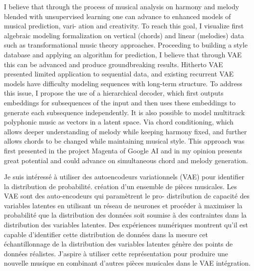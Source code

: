 I believe that through the process of musical analysis on harmony and melody blended
with unsupervised learning one can advance to enhanced models of musical prediction, vari-
ation and creativity. To reach this goal, I visualize first algebraic modeling formalization on
vertical (chords) and linear (melodies) data such as transformational music theory approaches.
Proceeding to building a style database and applying an algorithm for prediction, I believe that
through VAE this can be advanced and produce groundbreaking results.
Hitherto VAE presented limited application to sequential data, and existing recurrent VAE
models have difficulty modeling sequences with long-term structure. To address this issue, I
propose the use of a hierarchical decoder, which first outputs embeddings for subsequences
of the input and then uses these embeddings to generate each subsequence independently. It
is also possible to model multitrack polyphonic music as vectors in a latent space. Via chord
conditioning, which allows deeper understanding of melody while keeping harmony fixed,
and further allows chords to be changed while maintaining musical style. This approach was
first presented in the project Magenta of Google AI and in my opinion presents great potential
and could advance on simultaneous chord and melody generation.

Je suis intéressé à utiliser des autoencodeurs variationnels (VAE) pour identifier la distribution de probabilité.
création d’un ensemble de pièces musicales. Les VAE sont des auto-encodeurs qui paramètrent le pro-
distribution de capacité des variables latentes en utilisant un réseau de neurones et procéder à maximiser
la probabilité que la distribution des données soit soumise à des contraintes dans la distribution des variables latentes.
Des expériences numériques montrent qu'il est capable d'identifier cette distribution de données dans la mesure
cet échantillonnage de la distribution des variables latentes génère des points de données réalistes. J'aspire à
utiliser cette représentation pour produire une nouvelle musique en combinant d'autres pièces musicales dans le VAE
intégration.

